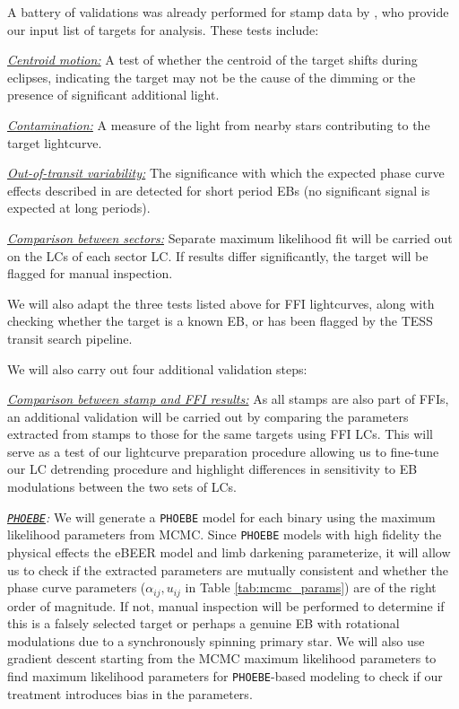 A battery of validations was already performed for stamp data by
\citep{Prsa_et_al_22}, who provide our input list of targets for analysis. These
tests include:

\textit{\underline{Centroid motion:}} A test of whether the centroid of the
target shifts during eclipses, indicating the target may not be the cause of the
dimming or the presence of significant additional light.

\textit{\underline{Contamination:}} A measure of the light from nearby stars
contributing to the target lightcurve.

\textit{\underline{Out-of-transit variability:}} The significance with which the
expected phase curve effects described in  are
detected for short period EBs (no significant signal is expected at long
periods).

\textit{\underline{Comparison between sectors:}} Separate maximum likelihood fit
will be carried out on the LCs of each \tess{} sector LC. If results differ
significantly, the target will be flagged for manual inspection.

We will also adapt the three tests listed above for FFI lightcurves, along with
checking whether the target is a known EB, or has been flagged by the TESS
transit search pipeline.

We will also carry out four additional validation steps:

\textit{\underline{Comparison between stamp and FFI results:}} As all stamps are
also part of FFIs, an additional validation will be carried out by comparing the
parameters extracted from stamps to those for the same targets using FFI LCs.
This will serve as a test of our lightcurve preparation procedure allowing us to
fine-tune our LC detrending procedure and highlight differences in sensitivity
to EB modulations between the two sets of LCs.

\textit{\underline{\texttt{PHOEBE}}:} We will generate a \texttt{PHOEBE} model
for each binary using the maximum likelihood parameters from MCMC. Since
\texttt{PHOEBE} models with high fidelity the physical effects the eBEER model
and limb darkening parameterize, it will allow us to check if the extracted
parameters are mutually consistent and whether the phase curve parameters
($\alpha_{ij}, u_{ij}$ in Table \ref{tab:mcmc_params}) are of the right order of
magnitude. If not, manual inspection will be performed to determine if this is
a falsely selected target or perhaps a genuine EB with rotational modulations
due to a synchronously spinning primary star. We will also use gradient descent
starting from the MCMC maximum likelihood parameters to find maximum likelihood
parameters for \texttt{PHOEBE}-based modeling to check if our treatment
introduces bias in the parameters.

